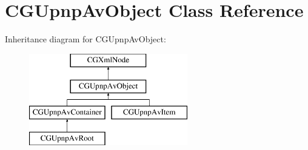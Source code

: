 \hypertarget{interface_c_g_upnp_av_object}{\section{C\-G\-Upnp\-Av\-Object Class Reference}
\label{interface_c_g_upnp_av_object}
}
Inheritance diagram for C\-G\-Upnp\-Av\-Object\-:\begin{figure}[H]
\begin{center}
\leavevmode
\includegraphics[height=4.000000cm]{interface_c_g_upnp_av_object}
\end{center}
\end{figure}
